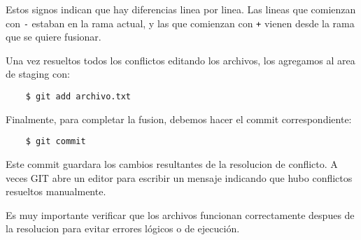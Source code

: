     Estos signos indican que hay diferencias linea por linea. Las lineas que comienzan con \texttt{-} estaban en la rama actual, y las que comienzan con \texttt{+} vienen desde la rama que se quiere fusionar.

    Una vez resueltos todos los conflictos editando los archivos, los agregamos al area de staging con:

    \begin{lstlisting}
    $ git add archivo.txt
    \end{lstlisting}

    Finalmente, para completar la fusion, debemos hacer el commit correspondiente:

    \begin{lstlisting}
    $ git commit
    \end{lstlisting}

    Este commit guardara los cambios resultantes de la resolucion de conflicto. A veces GIT abre un editor para escribir un mensaje indicando que hubo conflictos resueltos manualmente.

    Es muy importante verificar que los archivos funcionan correctamente despues de la resolucion para evitar errores l\'ogicos o de ejecuci\'on.